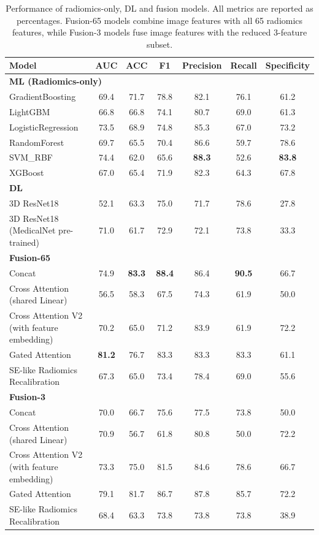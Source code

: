 \begin{table}[ht]
\centering
\caption{Performance of radiomics-only, DL and fusion models. All metrics are reported as percentages. Fusion-65 models combine image features with all 65 radiomics features, while Fusion-3 models fuse image features with the reduced 3-feature subset.}\label{table:perform}
\begin{tabular}{p{7cm}cccccc}
\toprule
Model & AUC & ACC & F1 & Precision & Recall  & Specificity\\
\midrule
\multicolumn{7}{l}{\textbf{ML (Radiomics-only)}} \\
GradientBoosting         & 69.4 & 71.7 & 78.8 & 82.1 & 76.1 & 61.2 \\
LightGBM                 & 66.8 & 66.8 & 74.1 & 80.7 & 69.0 & 61.3 \\
LogisticRegression       & 73.5 & 68.9 & 74.8 & 85.3 & 67.0 & 73.2 \\
RandomForest             & 69.7 & 65.5 & 70.4 & 86.6 & 59.7 & 78.6 \\
SVM\_RBF                 & 74.4 & 62.0 & 65.6 & \textbf{88.3} & 52.6 & \textbf{83.8} \\
XGBoost                  & 67.0 & 65.4 & 71.9 & 82.3 & 64.3 & 67.8 \\
\midrule
\multicolumn{7}{l}{\textbf{DL}} \\
3D ResNet18                          & 52.1 & 63.3 & 75.0 & 71.7 & 78.6 & 27.8 \\
3D ResNet18 (MedicalNet pre-trained) & 71.0 & 61.7 & 72.9 & 72.1 & 73.8 & 33.3 \\
\midrule
\multicolumn{7}{l}{\textbf{Fusion-65}} \\
Concat                              & 74.9 & \textbf{83.3} & \textbf{88.4} & 86.4 & \textbf{90.5} & 66.7 \\
Cross Attention (shared Linear)     & 56.5 & 58.3 & 67.5 & 74.3 & 61.9 & 50.0 \\
Cross Attention V2 (with feature embedding) & 70.2 & 65.0 & 71.2 & 83.9 & 61.9 & 72.2 \\
Gated Attention                     & \textbf{81.2} & 76.7 & 83.3 & 83.3 & 83.3 & 61.1 \\
SE-like Radiomics Recalibration     & 67.3 & 65.0 & 73.4 & 78.4 & 69.0 & 55.6 \\
\midrule
\multicolumn{7}{l}{\textbf{Fusion-3}} \\
Concat                              & 70.0 & 66.7 & 75.6 & 77.5 & 73.8 & 50.0 \\
Cross Attention (shared Linear)     & 70.9 & 56.7 & 61.8 & 80.8 & 50.0 & 72.2 \\
Cross Attention V2 (with feature embedding) & 73.3 & 75.0 & 81.5 & 84.6 & 78.6 & 66.7 \\
Gated Attention                     & 79.1 & 81.7 & 86.7 & 87.8 & 85.7 & 72.2 \\
SE-like Radiomics Recalibration     & 68.4 & 63.3 & 73.8 & 73.8 & 73.8 & 38.9 \\
\midrule
\bottomrule
\end{tabular}
\end{table}

